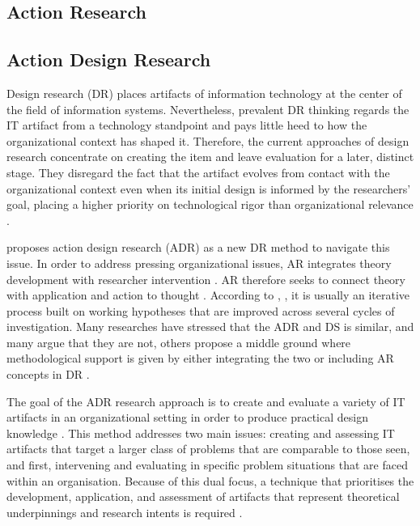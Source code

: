 \subsection{Action Research}
\subsection{Action Design Research}
\par{Design research (DR) places artifacts of information technology at the center of the field of information systems. Nevertheless, prevalent DR thinking regards the IT artifact from a technology standpoint and pays little heed to how the organizational context has shaped it. Therefore, the current approaches of design research concentrate on creating the item and leave evaluation for a later, distinct stage. They disregard the fact that the artifact evolves from contact with the organizational context even when its initial design is informed by the researchers' goal, placing a higher priority on technological rigor than organizational relevance \citep{sein2011action}.}
\par{\cite{sein2011action} proposes action design research (ADR) as a new DR method to navigate this issue. In order to address pressing organizational issues, AR integrates theory development with researcher intervention \citep{baburoglu1992normative,baskerville1998diversity}. AR therefore seeks to connect theory with application and action to thought \citep{susman1983action}. According to \cite{davison2004principles}, \cite{susman2023assessment}, it is usually an iterative process built on working hypotheses that are improved across several cycles of investigation. Many researches have stressed that the ADR and DS is similar, and many argue that they are not, others propose a middle ground where methodological support is given by either integrating the two \citep{sein2011action} or including AR concepts in DR \citep{pries2007soft}. }
\par{The goal of the ADR research approach is to create and evaluate a variety of IT artifacts in an organizational setting in order to produce practical design knowledge \citep{sein2011action}. This method addresses two main issues: creating and assessing IT artifacts that target a larger class of problems that are comparable to those seen, and first, intervening and evaluating in specific problem situations that are faced within an organisation. Because of this dual focus, a technique that prioritises the development, application, and assessment of artifacts that represent theoretical underpinnings and research intents is required \citep{sein2011action}.}
